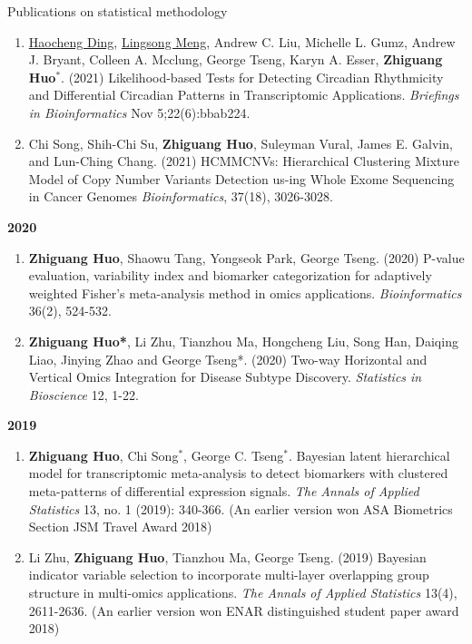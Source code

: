 \documentclass{resume} %
\begin{document}
\begin{rSection}{Publications on statistical methodology}
\begin{enumerate}[noitemsep,topsep=0pt, resume]
\item
\underline{Haocheng Ding}, \underline{Lingsong Meng}, Andrew C. Liu, Michelle L. Gumz, Andrew J. Bryant, Colleen A. Mcclung, George Tseng, Karyn A. Esser, {\bf Zhiguang Huo}$^*$.  (2021)
Likelihood-based Tests for Detecting Circadian Rhythmicity and Differential Circadian Patterns in Transcriptomic Applications. 
\emph{Briefings in Bioinformatics} Nov 5;22(6):bbab224.

\item  
Chi Song, Shih-Chi Su, {\bf Zhiguang Huo}, Suleyman Vural, James E. Galvin, and Lun-Ching Chang. (2021) 
HCMMCNVs: Hierarchical Clustering Mixture Model of Copy Number Variants Detection us-ing Whole Exome Sequencing in Cancer Genomes
\emph{Bioinformatics}, 37(18), 3026-3028.

\end{enumerate}

\textbf{2020}
\begin{enumerate}[noitemsep,topsep=0pt, resume]

\item  {\bf  Zhiguang Huo}, Shaowu Tang, Yongseok Park, George Tseng. (2020) 
P-value evaluation, variability index and biomarker categorization for adaptively weighted Fisher's meta-analysis method in omics applications. 
\emph{Bioinformatics} 36(2), 524-532.

\item {\bf  Zhiguang Huo*}, Li Zhu, Tianzhou Ma, Hongcheng Liu, Song Han, Daiqing Liao, Jinying Zhao and George Tseng*.  (2020)
Two-way Horizontal and Vertical Omics Integration for Disease Subtype Discovery. \emph{Statistics in Bioscience} 12, 1-22.

\end{enumerate}

\textbf{2019}
\begin{enumerate}[noitemsep,topsep=0pt,resume]

\item 
{\bf Zhiguang Huo}, Chi Song$^*$, George C. Tseng$^*$. 
Bayesian latent hierarchical model for transcriptomic meta-analysis to detect biomarkers with clustered meta-patterns of differential expression signals. \emph{The Annals of Applied Statistics} 13, no. 1 (2019): 340-366. (An earlier version won ASA Biometrics Section JSM Travel Award 2018)

\item Li Zhu, {\bf  Zhiguang Huo}, Tianzhou Ma, George Tseng. (2019)
Bayesian indicator variable selection to incorporate multi-layer overlapping group structure in multi-omics applications. 
\emph{The Annals of Applied Statistics} 13(4), 2611-2636. 
(An earlier version won ENAR distinguished student paper award 2018)


\end{enumerate}
\end{rSection}
\end{document}
